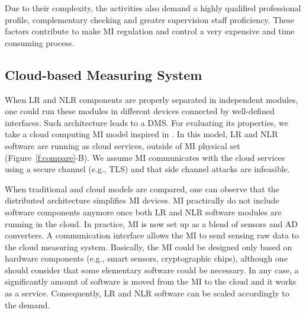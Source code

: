 \documentclass[journal]{IEEEtran}
\begin{document}
Due to their complexity, the activities also demand a highly qualified professional profile, complementary checking and greater supervision staff proficiency. These factors contribute to make MI regulation and control a very expensive and time consuming process.

\subsection{Cloud-based Measuring System}
\label{s:mi_cloud}
When LR and NLR components are properly separated in independent modules, one could run these modules in different devices connected by well-defined interfaces.
Such architecture leads to a DMS.
For evaluating its properties, we take a cloud computing MI model inspired in \cite{Oppermann2016}.
In this model, LR and NLR software are running as cloud services, outside of MI physical set (Figure~\ref{f:compare}-B).
We assume MI communicates with the cloud services using a secure channel (e.g., TLS) and that side channel attacks are infeasible.

When traditional and cloud models are compared, one can observe that the distributed architecture simplifies MI devices.
MI practically do not include software components anymore once both LR and NLR software modules are running in the cloud.
In practice, MI is now set up as a blend of sensors and AD converters.
A communication interface allows the MI to send sensing raw data to the cloud measuring system. 
Basically, the MI could be designed only based on hardware components (e.g., smart sensors, cryptographic chips), although one should consider that some elementary software could be necessary.
In any case, a significantly amount of software is moved from the MI to the cloud and it works as a service. 
Consequently, LR and NLR software can be scaled accordingly to the demand.

\end{document}

